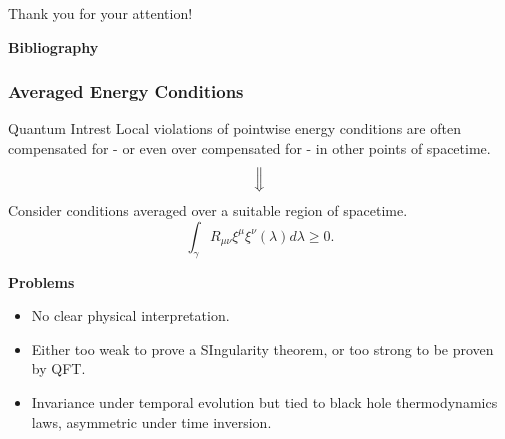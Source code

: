 \documentclass[]{beamer}
\begin{document}
\begin{frame}
	\centering
	\vskip 7pt
	{\Huge \textcolor{theorem}{Thank you for your attention!}}

	\vskip 3pt
	\textbf{Bibliography}
	\printbibliography
\end{frame}

\begin{frame}
	\frametitle{Averaged Energy Conditions}
	\begin{ideablock}{Quantum Intrest}
		Local violations of pointwise energy conditions are often compensated for - or even over compensated for - in other points of spacetime.
		\[
		\Big\Downarrow
		\]
		Consider conditions averaged over a suitable region of spacetime.
		\[
		\int_{\gamma} R_{\mu\nu}\xi^{\mu}\xi^{\nu}(\lambda)d\lambda \ge 0.
		\]
	\end{ideablock}
	
	\textbf{Problems}
	\begin{itemize}
		\item No clear physical interpretation.
		\item Either too weak to prove a SIngularity theorem, or too strong to be proven by QFT.
		\item Invariance under temporal evolution but tied to black hole thermodynamics laws, asymmetric under time inversion.
	\end{itemize}
	
	
\end{frame}
\end{document}
